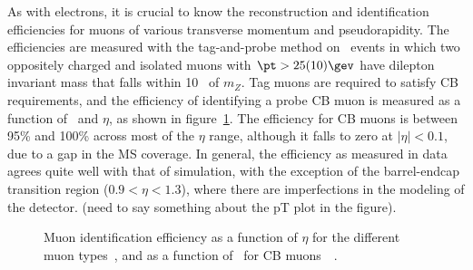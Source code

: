 As with electrons, it is crucial to know the reconstruction and
identification efficiencies for muons of various transverse momentum
and pseudorapidity. The efficiencies are measured with the
tag-and-probe method on \Zmm~events in which two oppositely charged
and isolated muons with $\pt>25 (10) \gev$ have dilepton invariant
mass that falls within 10 \gev~of $m_Z$. Tag muons are required to
satisfy CB requirements, and the efficiency of identifying a probe CB
muon is measured as a function of \pt~and $\eta$, as shown in
figure~\ref{chap:reconstruction:fig:muon_tp}. The efficiency for CB
muons is between 95\% and 100\% across most of the $\eta$ range,
although it falls to zero at $|\eta|<0.1$, due to a gap in the MS
coverage. In general, the efficiency as measured in data agrees quite
well with that of simulation, with the exception of the barrel-endcap
transition region ($0.9<\eta<1.3$), where there are imperfections in the
modeling of the detector. (need to say something about the pT plot in
the figure).

\begin{figure}[h!]
    \centering
    \caption[]{Muon identification efficiency as a function of
      $\eta$ for the different muon
      types~, and as a
      function of \pt~for CB muons~~\cite{bib:Aad:2014rra}.}
\label{chap:reconstruction:fig:muon_tp}
\end{figure}

